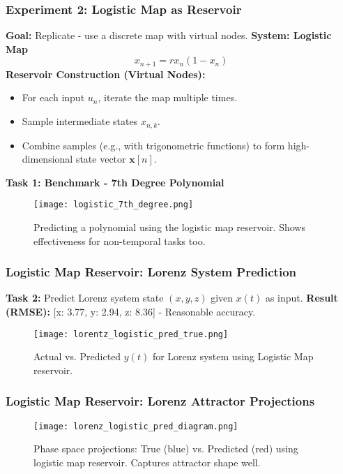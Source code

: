 \documentclass{beamer}
\begin{document}
\begin{frame}
    \frametitle{Experiment 2: Logistic Map as Reservoir}
    \textbf{Goal:} Replicate \cite{Arun2024} - use a discrete map with virtual nodes.
    \vspace{1em}
    \textbf{System: Logistic Map}
    \[ x_{n+1} = r x_n (1 - x_n) \]
    \textbf{Reservoir Construction (Virtual Nodes):}
    \begin{itemize}
        \item For each input $u_n$, iterate the map multiple times.
        \item Sample intermediate states $x_{n,k}$.
        \item Combine samples (e.g., with trigonometric functions) to form high-dimensional state vector $\mathbf{x}[n]$.
    \end{itemize}
    \pause
    \textbf{Task 1: Benchmark - 7th Degree Polynomial}
     \begin{figure}
        \centering
        \texttt{[image: logistic\_7th\_degree.png]}
        \caption{Predicting a polynomial using the logistic map reservoir. Shows effectiveness for non-temporal tasks too.}
        \label{fig:logistic_map_slide}
    \end{figure}
\end{frame}

\begin{frame}
    \frametitle{Logistic Map Reservoir: Lorenz System Prediction}
    \textbf{Task 2:} Predict Lorenz system state $(x, y, z)$ given $x(t)$ as input.
    \vspace{1em}
    \textbf{Result (RMSE):} [x: 3.77, y: 2.94, z: 8.36] - Reasonable accuracy.
    \pause
     \begin{figure}
        \centering
        \texttt{[image: lorentz\_logistic\_pred\_true.png]}
        \caption{Actual vs. Predicted $y(t)$ for Lorenz system using Logistic Map reservoir.}
        \label{fig:logistic_map_lorenz_slide}
    \end{figure}
\end{frame}

\begin{frame}
    \frametitle{Logistic Map Reservoir: Lorenz Attractor Projections}
     \begin{figure}
        \centering
        \texttt{[image: lorenz\_logistic\_pred\_diagram.png]}
        \caption{Phase space projections: True (blue) vs. Predicted (red) using logistic map reservoir. Captures attractor shape well.}
        \label{fig:logistic_map_lorenz_diag_slide}
    \end{figure}
\end{frame}
\end{document}
